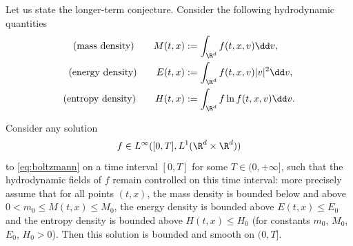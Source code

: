 Let us state the longer-term conjecture. Consider the following
hydrodynamic quantities
\begin{align*}
\text{(mass density)} \qquad M (t,x) &:= \int_{\R^d} f(t,x,v) \dd v, \\
\text{(energy density)} \qquad E (t,x) & := \int_{\R^d} f(t,x,v) |v|^2 \dd v, \\
\text{(entropy density)} \qquad H (t,x) & := \int_{\R^d} f \ln f (t,x,v) \dd v.
\end{align*}

\begin{conj*}
Consider any
solution
\[
f \in L^\infty([0,T],L^1(\R^d \times \R^d))
\]
to \eqref{eq:boltzmann} on a time interval $[0,T]$ for some
$T \in (0,+\infty]$, such that the hydrodynamic fields of $f$ remain
controlled on this time interval: more precisely assume that for all
points $(t,x)$, the mass density is bounded below and above
$0 < m_0 \leq M(t,x) \leq M_0$, the energy density is bounded above
$E(t,x) \leq E_0$ and the entropy density is bounded above
$H(t,x) \leq H_0$ (for constants $m_0$, $M_0$, $E_0$, $H_0>0$). Then
this solution is bounded and smooth on
$(0,T]$.
\end{conj*}

